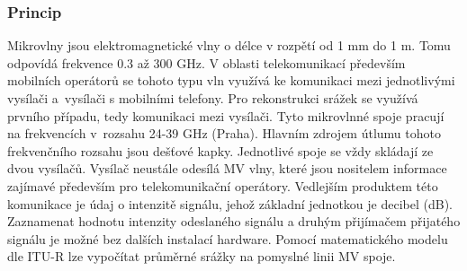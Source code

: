 \documentclass[a4paper,12pt,oneside]{report}
\begin{document}
    
\subsubsection{Princip}
Mikrovlny jsou elektromagnetické vlny o délce v rozpětí od 1 mm do 1
m. Tomu odpovídá frekvence 0.3 až 300 GHz. V oblasti
telekomunikací především mobilních operátorů se tohoto typu vln
využívá ke komunikaci mezi jednotlivými vysílači a~vysílači s
mobilními telefony. Pro rekonstrukci srážek se využívá prvního
případu, tedy komunikaci mezi vysílači. Tyto mikrovlnné spoje pracují
na frekvencích v~roz\-sahu 24-39 GHz (Praha). Hlavním zdrojem útlumu
tohoto frekvenčního rozsahu jsou dešťové kapky. Jednotlivé spoje se
vždy skládají ze dvou vysílačů. Vysílač neustále odesílá MV vlny,
které jsou nositelem informace zajímavé především pro telekomunikační
operátory. Vedlejším produktem této komunikace je údaj o intenzitě
signálu, jehož základní jednotkou je decibel (dB). Zaznamenat hodnotu
intenzity odeslaného signálu a druhým přijímačem přijatého signálu je
možné bez dalších instalací hardware. Pomocí matematického
modelu dle ITU-R \cite{itu} lze vypočítat průměrné srážky na pomyslné
linii MV spoje.
\end{document}
